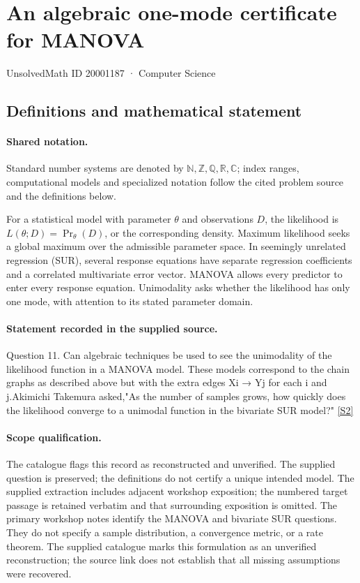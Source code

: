 \documentclass[11pt]{article}
\newcommand{\sref}[2]{\hyperlink{source:#1:#2}{[S#2]}}
\begin{document}
\setcounter{section}{20001186}
\section{An algebraic one-mode certificate for MANOVA}\label{20001187}
{\small\sffamily UnsolvedMath ID 20001187 · Computer Science}
\subsection{Definitions and mathematical statement}

\paragraph{Shared notation.}Standard number systems are denoted by $\mathbb N,\mathbb Z,\mathbb Q,\mathbb R,\mathbb C$; index ranges, computational models and specialized notation follow the cited problem source and the definitions below.


For a statistical model with parameter $\theta$ and observations $D$, the likelihood is $L(\theta;D)=\Pr_\theta(D)$, or the corresponding density. Maximum likelihood seeks a global maximum over the admissible parameter space. In seemingly unrelated regression (SUR), several response equations have separate regression coefficients and a correlated multivariate error vector. MANOVA allows every predictor to enter every response equation. Unimodality asks whether the likelihood has only one mode, with attention to its stated parameter domain.
\paragraph{Statement recorded in the supplied source.}
Question 11. Can algebraic techniques be used to see the unimodality of the likelihood function in a MANOVA model. These models correspond to the chain graphs as described above but with the extra edges Xi → Yj for each i and j.Akimichi Takemura asked,"As the number of samples grows, how quickly does the likelihood converge to a unimodal function in the bivariate SUR model?" \sref{20001187}{2}
\paragraph{Scope qualification.}
The catalogue flags this record as reconstructed and unverified. The supplied question is preserved; the definitions do not certify a unique intended model. The supplied extraction includes adjacent workshop exposition; the numbered target passage is retained verbatim and that surrounding exposition is omitted. The primary workshop notes identify the MANOVA and bivariate SUR questions. They do not specify a sample distribution, a convergence metric, or a rate theorem.
The supplied catalogue marks this formulation as an unverified reconstruction; the source link does not establish that all missing assumptions were recovered.
\end{document}
